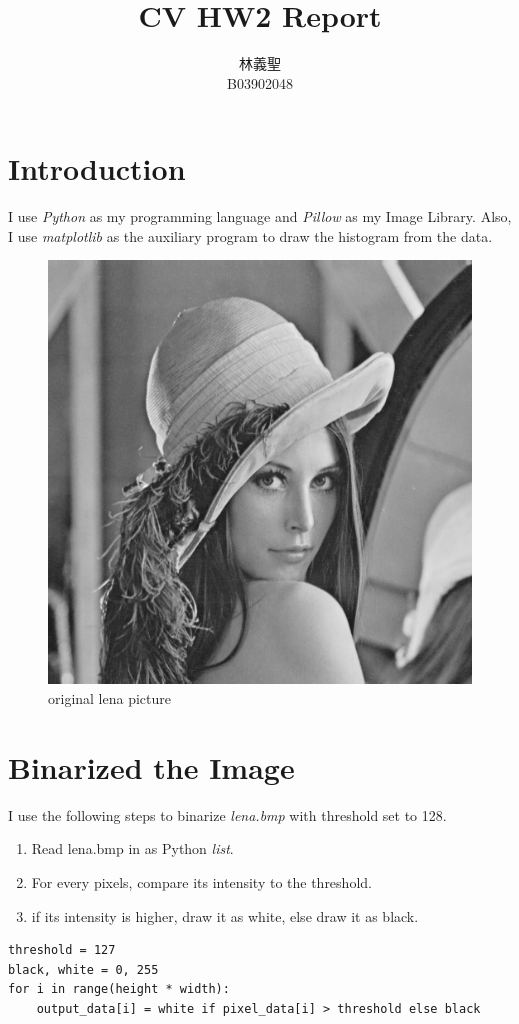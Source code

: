 \documentclass[12pt,twoside,a4paper]{article}
\title{CV HW2 Report}
\author{林義聖\\B03902048}
\date{}
\begin{document}
\maketitle

\section{Introduction}

I use \textit{Python} as my programming language and \textit{Pillow} as my Image Library. Also, I use \textit{matplotlib} as the auxiliary program to draw the histogram from the data.

\begin{figure}[H]
\centering
\includegraphics[scale=0.4]{lena.bmp}
\caption{original lena picture}
\label{fig:lena.bmp}
\end{figure}

\section{Binarized the Image}
I use the following steps to binarize \textit{lena.bmp} with threshold set to 128.
\begin{enumerate}
	\item Read lena.bmp in as Python \textit{list}.
	\item For every pixels, compare its intensity to the threshold.
	\item if its intensity is higher, draw it as white, else draw it as black.
\end{enumerate}
\begin{lstlisting}[caption=Binarize the image]
threshold = 127
black, white = 0, 255
for i in range(height * width):
    output_data[i] = white if pixel_data[i] > threshold else black
\end{lstlisting}
\end{document}
